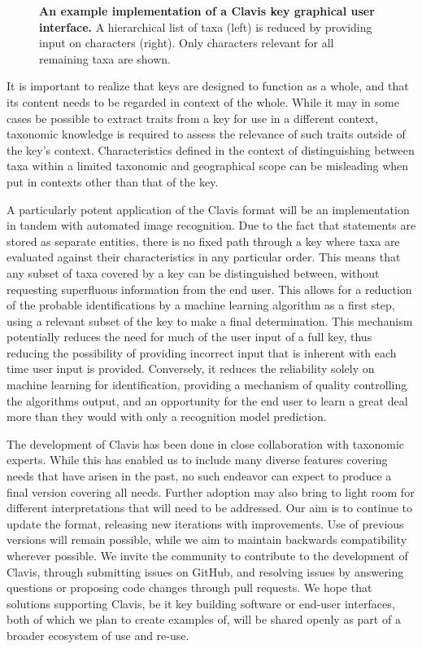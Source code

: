 \documentclass[10pt,letterpaper]{article}
\begin{document}
\begin{figure}[!h]
  \caption{{\bf An example implementation of a Clavis key graphical user interface.}
A hierarchical list of taxa (left) is reduced by providing input on characters (right). Only characters relevant for all remaining taxa are shown.
}
  \label{fig5}
\end{figure}

It is important to realize that keys are designed to function as a whole, and that its content needs to be regarded in context of the whole. While it may in some cases be possible to extract traits from a key for use in a different context, taxonomic knowledge is required to assess the relevance of such traits outside of the key's context. Characteristics defined in the context of distinguishing between taxa within a limited taxonomic and geographical scope can be misleading when put in contexts other than that of the key.

A particularly potent application of the Clavis format will be an implementation in tandem with automated image recognition. Due to the fact that statements are stored as separate entities, there is no fixed path through a key where taxa are evaluated against their characteristics in any particular order. This means that any subset of taxa covered by a key can be distinguished between, without requesting superfluous information from the end user. This allows for a reduction of the probable identifications by a machine learning algorithm as a first step, using a relevant subset of the key to make a final determination. This mechanism potentially reduces the need for much of the user input of a full key, thus reducing the possibility of providing incorrect input that is inherent with each time user input is provided. Conversely, it reduces the reliability solely on machine learning for identification, providing a mechanism of quality controlling the algorithms output, and an opportunity for the end user to learn a great deal more than they would with only a recognition model prediction.

The development of Clavis has been done in close collaboration with taxonomic experts. While this has enabled us to include many diverse features covering needs that have arisen in the past, no such endeavor can expect to produce a final version covering all needs. Further adoption may also bring to light room for different interpretations that will need to be addressed. Our aim is to continue to update the format, releasing new iterations with improvements. Use of previous versions will remain possible, while we aim to maintain backwards compatibility wherever possible. We invite the community to contribute to the development of Clavis, through submitting issues on GitHub, and resolving issues by answering questions or proposing code changes through pull requests. We hope that solutions supporting Clavis, be it key building software or end-user interfaces, both of which we plan to create examples of, will be shared openly as part of a broader ecosystem of use and re-use.
\end{document}
